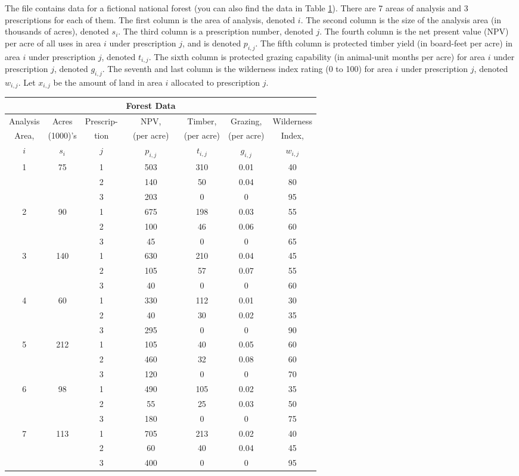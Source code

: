 The file  contains data for a fictional national forest (you can also find the data
in Table \ref{tab:forest}). There are 7 areas of analysis and 3 prescriptions for each of them. 
The first column is the area of analysis, denoted $i$. The second column is the size of the analysis area (in thousands of acres), denoted $s_i$. The third column is a prescription number, denoted $j$. The fourth column is the net present value (NPV) per acre of all uses in area $i$ under prescription $j$, and is denoted $p_{i,j}$. The fifth column is protected timber yield (in board-feet per acre) in area $i$ under prescription $j$, denoted $t_{i,j}$. The sixth column is protected grazing capability (in animal-unit months per acre) for area $i$ under prescription $j$, denoted
$g_{i,j}$. The seventh and last column is the wilderness index rating (0 to 100) for area $i$ under prescription $j$, denoted $w_{i,j}$. Let $x_{i,j}$ be the amount of land in area $i$ allocated to prescription $j$.

\begin{table}[h]
\centering
    \begin{tabular}{c c c c c c c}
&&&Forest Data&&& \\
\hline
Analysis & Acres &Prescrip-&NPV,&Timber,&Grazing,&Wilderness \\
Area,&(1000)'s &tion&(per acre) &(per acre)&(per acre)& Index,\\
$i$ &$s_i$&$j$& $p_{i,j}$ & $t_{i,j}$&$g_{i,j}$&$w_{i,j}$ \\\hline
1&	75	&1	&503	&310	&0.01&	40\\
&&		2&	140&	50&	0.04	&80\\
&&		3&	203&	0&	0&	95\\ \hline
2&	90&	1	&675&	198&	0.03&	55\\
&&		2&	100&	46&	0.06&	60\\
&&		3&	45&	0&	0&	65\\ \hline
3&	140&	1	&630&	210	&0.04&	45\\
&&		2&	105&	57&	0.07&	55\\
&&		3&	40	&0&	0&	60\\ \hline
4	&60&	1&	330&	112&	0.01&	30\\
&&		2	&40&	30&	0.02&	35\\
&&		3&	295&	0&	0	&90\\ \hline
5	&212&	1	&105	&40	&0.05&	60\\
&&		2	&460&	32	&0.08&	60\\
&& 3	&120&0&	0	&70\\ \hline
6	&98	&1	&490	&105	&0.02	&35\\
&&		2&	55	&25	&0.03	&50\\
&&		3	&180	&0	&0	&75\\ \hline
7&	113&	1	&705	&213&	0.02	&40\\
&&		2&	60	&40	&0.04&	45\\
&&		3	&400	&0	&0	&95\\
\hline
    \end{tabular}
\label{tab:forest}
\end{table}

